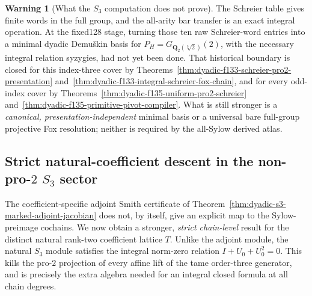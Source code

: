 \documentclass[11pt]{article}
\theoremstyle{definition}
\newtheorem{warning}[theorem]{Warning}
\begin{document}
\begin{warning}[What the $S_3$ computation does not prove]
\label{warn:dyadic-s3-syzygy-scope}
The Schreier table gives finite
words in the full group, and
the all-arity bar transfer is
an exact integral operation.
At the fixed128 stage, turning those ten raw
Schreier-word entries into a
minimal dyadic Demu\v{s}kin basis for
$P_H=G_{\mathbf Q_2(\sqrt[3]2)}(2)$,
with the necessary
integral relation syzygies, had
not yet been done.
That historical boundary is closed for this
index-three cover by
Theorems~\ref{thm:dyadic-f133-schreier-pro2-presentation}
and~\ref{thm:dyadic-f133-integral-schreier-fox-chain},
and for every odd-index cover by
Theorems~\ref{thm:dyadic-f135-uniform-pro2-schreier}
and~\ref{thm:dyadic-f135-primitive-pivot-compiler}.
What is still stronger is a \emph{canonical,
presentation-independent} minimal basis or a
universal bare full-group projective Fox resolution;
neither is required by the all-Sylow derived atlas.
\end{warning}


\subsection{Strict natural-coefficient descent in the non-pro-$2$ $S_3$ sector}
\label{subsec:dyadic-s3-natural-strict-transfer}

The coefficient-specific adjoint Smith certificate of
Theorem~\ref{thm:dyadic-s3-marked-adjoint-jacobian}
does not, by itself, give an explicit map to the
Sylow-preimage cochains.  We now obtain a stronger,
\emph{strict chain-level} result for the distinct
natural rank-two coefficient lattice $T$.
Unlike the adjoint module, the natural $S_3$ module
satisfies the integral norm-zero relation
$I+U_0+U_0^2=0$.  This kills the pro-$2$
projection of every affine lift of the tame
order-three generator, and is precisely the
extra algebra needed for an integral closed
formula at all chain degrees.
\end{document}
